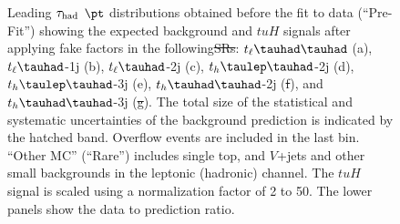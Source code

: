 \documentclass[PAPER, coverpage, atlasdraft=true, texlive=2016, UKenglish]{\ATLASLATEXPATH atlasdoc} %
\providecommand{\DIFadd}[1]{{\protect\color{blue}\uwave{#1}}} %
\providecommand{\DIFdel}[1]{{\protect\color{red}\sout{#1}}}                      %
\providecommand{\DIFaddFL}[1]{\DIFadd{#1}} %
\providecommand{\DIFdelFL}[1]{\DIFdel{#1}} %
\providecommand{\DIFaddbeginFL}{} %
\providecommand{\DIFaddendFL}{} %
\providecommand{\DIFdelbeginFL}{} %
\providecommand{\DIFdelendFL}{} %
\begin{document}
\begin{figure}[H]
\begin{tabular}{@{}ccc@{}}
\end{tabular}
\caption{Leading $\tau_\text{had}$ $\pt$  distributions obtained before the fit to data (``Pre-Fit'') showing 
  the expected background and $tuH$ signals after applying fake factors in the following\DIFdelbeginFL \DIFdelFL{SRs}\DIFdelendFL : $t_{\ell}\thadhad$ (a),
 $t_{\ell}\tauhad$-1j (b),  $t_{\ell}\tauhad$-2j (c), $t_h\tlhad$-2j (d), $t_h\tlhad$-3j (e), \DIFaddbeginFL \DIFaddFL{$t_{\ell}\thadhad$-SS  (f), }\DIFaddendFL $t_h\thadhad$-2j (\DIFdelbeginFL \DIFdelFL{f}\DIFdelendFL \DIFaddbeginFL \DIFaddFL{g}\DIFaddendFL ), \DIFaddbeginFL \DIFaddFL{$t_h\thadhad$-3j (h) }\DIFaddendFL and $t_h\thadhad$-3j \DIFaddbeginFL \DIFaddFL{SS }\DIFaddendFL (\DIFdelbeginFL \DIFdelFL{g}\DIFdelendFL \DIFaddbeginFL \DIFaddFL{i}\DIFaddendFL ).
 The total size of the statistical and systematic uncertainties of the background prediction is indicated by the hatched band.
 Overflow events are included in the last bin. ``Other MC'' (``Rare'') includes single top, and $V$+jets and other small backgrounds in the leptonic (hadronic) channel. The $tuH$ signal is scaled using a normalization factor of 2 to 50.   
The lower panels show the data to prediction ratio.}
\label{fig:taupt_prefit}
\end{figure}




\end{document}
